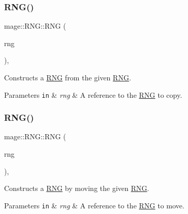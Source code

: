 \subsubsection{\texorpdfstring{R\+N\+G()}{RNG()}\hspace{0.1cm}{\footnotesize\ttfamily [2/3]}}
{\footnotesize\ttfamily mage\+::\+R\+N\+G\+::\+R\+NG (\begin{DoxyParamCaption}\item[{const \mbox{\hyperlink{classmage_1_1_r_n_g}{R\+NG}} \&}]{rng }\end{DoxyParamCaption})\hspace{0.3cm}{\ttfamily [default]}, {\ttfamily [noexcept]}}

Constructs a \mbox{\hyperlink{classmage_1_1_r_n_g}{R\+NG}} from the given \mbox{\hyperlink{classmage_1_1_r_n_g}{R\+NG}}.


\begin{DoxyParams}[1]{Parameters}
\mbox{\tt in}  & {\em rng} & A reference to the \mbox{\hyperlink{classmage_1_1_r_n_g}{R\+NG}} to copy. \\
\hline
\end{DoxyParams}
\mbox{\label{classmage_1_1_r_n_g_a6df36809ab6b982ee21d1987b6e9a693}} 
\subsubsection{\texorpdfstring{R\+N\+G()}{RNG()}\hspace{0.1cm}{\footnotesize\ttfamily [3/3]}}
{\footnotesize\ttfamily mage\+::\+R\+N\+G\+::\+R\+NG (\begin{DoxyParamCaption}\item[{\mbox{\hyperlink{classmage_1_1_r_n_g}{R\+NG}} \&\&}]{rng }\end{DoxyParamCaption})\hspace{0.3cm}{\ttfamily [default]}, {\ttfamily [noexcept]}}

Constructs a \mbox{\hyperlink{classmage_1_1_r_n_g}{R\+NG}} by moving the given \mbox{\hyperlink{classmage_1_1_r_n_g}{R\+NG}}.


\begin{DoxyParams}[1]{Parameters}
\mbox{\tt in}  & {\em rng} & A reference to the \mbox{\hyperlink{classmage_1_1_r_n_g}{R\+NG}} to move. \\
\hline
\end{DoxyParams}
\mbox{\label{classmage_1_1_r_n_g_a20d24aabf31837e48a38b9ca221b0a9b}} 
